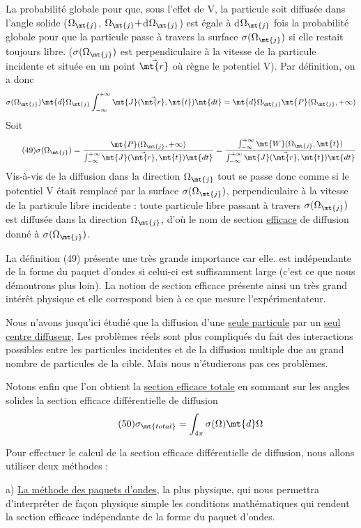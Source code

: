 La probabilité globale pour que, sous l'effet de V, la particule soit diffusée
dans l'angle solide ($\Omega_\mt{j}$, $\Omega_\mt{j}+$d$\Omega_\mt{j}$) est égale à d$\Omega_\mt{j}$ fois
la probabilité globale pour que la particule passe à travers la surface $\sigma(\Omega_\mt{j})$
si elle restait toujours libre. ($\sigma(\Omega_\mt{j})$ est perpendiculaire à la
vitesse de la particule incidente et située en un point $\vec{\mt{r}}$ où règne le
potentiel V).
Par définition, on a donc
\[
\sigma(\Omega_\mt{j})\mt{ d}\Omega_\mt{j}\int_{-\infty}^{+\infty}\mt{J}(\vec{\mt{r}},\mt{t})\mt{ dt}
=\mt{ d}\Omega_\mt{j}\mt{ P}(\Omega_\mt{j},+\infty)
\]
Soit
\[
\tag{49}\sigma(\Omega_\mt{j})=\frac{\mt{P}(\Omega_\mt{j},+\infty)}{\int_{-\infty}^{+\infty}\mt{J}(\vec{\mt{r}},\mt{t})\mt{ dt}}
=\frac{\int_{-\infty}^{+\infty}\mt{W}(\Omega_\mt{j},\mt{t})}{\int_{-\infty}^{+\infty}\mt{J}(\vec{\mt{r}},\mt{t})\mt{ dt}}
\]
Vis-à-vis de la diffusion dans la direction $\Omega_\mt{j}$ tout se passe donc comme
si le potentiel V était remplacé par la surface $\sigma(\Omega_\mt{j})$, perpendiculaire
à la vitesse de la particule libre incidente : toute particule libre passant à
travers $\sigma(\Omega_\mt{j})$ est diffusée dans la direction $\Omega_\mt{j}$, d'où le nom de
section \ul{efficace} de diffusion donné à $\sigma(\Omega_\mt{j})$.

La définition (49) présente une très grande importance car elle.
est indépendante de la forme du paquet d'ondes si celui-ci est suffisamment large
(c'est ce que nous démontrons plus loin). La notion de section
efficace présente ainsi un très grand intérêt physique et elle correspond
bien à ce que mesure l'expérimentateur.

Nous n'avons jusqu'ici étudié que la diffusion d'une \ul{seule particule}
par un \ul{seul centre diffuseur}, Les problèmes réels sont plus compliqués
du fait des interactions possibles entre les particules incidentes et de
la diffusion multiple due au grand nombre de particules de la cible. Mais
nous n'étudierons pas ces problèmes.

Notons enfin que l'on obtient la \ul{section efficace totale} en sommant sur les angles
solides la section efficace différentielle de diffusion
\[
\tag{50}\sigma_\mt{total}=\int_{4\pi}\sigma(\Omega)\mt{ d}\Omega
\]

Pour effectuer le calcul de la section efficace différentielle
de diffusion, nous allons utiliser deux méthodes :

a) \ul{La méthode des paquets d'ondes}, la plus physique, qui nous permettra
d'interpréter de façon physique simple les conditions mathématiques qui
rendent la section efficace indépendante de la forme du paquet d'ondes.

